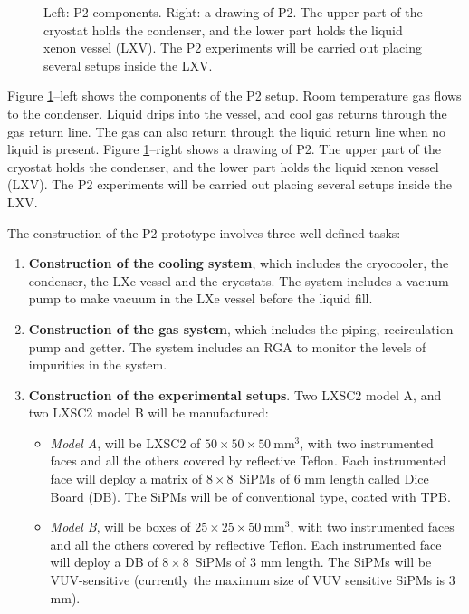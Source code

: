 \begin{figure}[!htb]
	\caption{\label{fig.cryo} Left: P2 components. Right: a drawing of P2. The upper part of the cryostat holds the condenser, and the lower part holds the liquid xenon vessel (LXV). The P2 experiments will be carried out placing several setups inside the LXV.}
\end{figure}

Figure \ref{fig.cryo}--left shows the components of the P2 setup. Room temperature gas flows to the condenser. Liquid drips into the vessel, and cool gas returns through the gas return line. The gas can also return through the liquid return line when no liquid is present. Figure \ref{fig.cryo}--right shows a drawing of P2. The upper part of the cryostat holds the condenser, and the lower part holds the liquid xenon vessel (LXV). The P2 experiments will be carried out placing several setups inside the LXV. 

The construction of the P2 prototype involves three well defined tasks: 
\begin{enumerate}
\item {\bf Construction of the cooling system}, which includes the cryocooler, the condenser, the LXe vessel and the cryostats.  The system includes a vacuum pump to make vacuum in the LXe vessel before the liquid fill.
\item {\bf Construction of the gas system}, which includes the piping, recirculation pump and getter. The system includes an RGA to monitor the levels of impurities in the system. 
\item {\bf Construction of the experimental setups}. Two LXSC2 model A, and two LXSC2 model B will be 
manufactured:
\begin{itemize}
\item {\em Model A}, will be LXSC2 of $50 \times 50 \times 50 \mathrm{~mm^3}$, with two instrumented faces and all the others covered by reflective Teflon. Each instrumented face will deploy a matrix of $8 \times 8$~SiPMs of 6 mm length called Dice Board (DB). The SiPMs will be of conventional type, coated with TPB.
\item {\em Model B}, will be boxes of $25 \times 25 \times 50 \mathrm{~mm^3}$, with two instrumented faces and all the others covered by reflective Teflon. Each instrumented face will deploy a DB of $8 \times 8$~SiPMs of 3 mm length. The SiPMs will be VUV-sensitive (currently the maximum size of VUV sensitive SiPMs is 3 mm). 
\end{itemize}
\end{enumerate}

